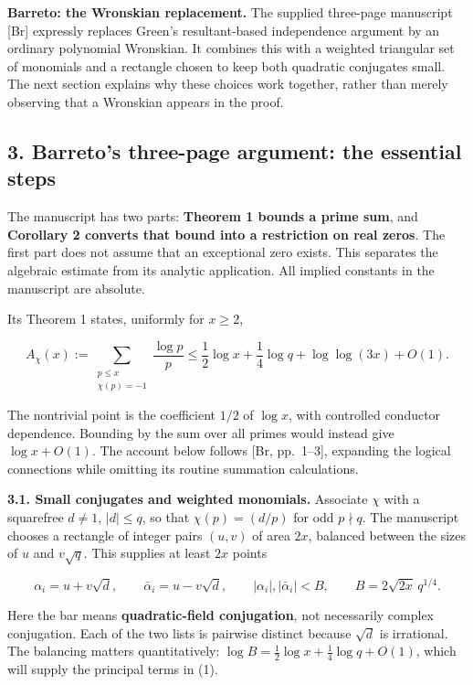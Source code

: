 \documentclass[11pt]{article}
\begin{document}
\textbf{Barreto: the Wronskian replacement.} The supplied three-page manuscript {[}Br{]} expressly replaces Green's resultant-based independence argument by an ordinary polynomial Wronskian. It combines this with a weighted triangular set of monomials and a rectangle chosen to keep both quadratic conjugates small. The next section explains why these choices work together, rather than merely observing that a Wronskian appears in the proof.

\subsection{3. Barreto's three-page argument: the essential steps}\label{barretos-three-page-argument-the-essential-steps}

The manuscript has two parts: \textbf{Theorem 1 bounds a prime sum}, and \textbf{Corollary 2 converts that bound into a restriction on real zeros}. The first part does not assume that an exceptional zero exists. This separates the algebraic estimate from its analytic application. All implied constants in the manuscript are absolute.

Its Theorem 1 states, uniformly for \(x\ge2\),

\[
A_\chi(x):=\sum_{\substack{p\le x\\\chi(p)=-1}}\frac{\log p}{p}
\le \frac12\log x+\frac14\log q+\log\log(3x)+O(1).
\tag{1}
\]

The nontrivial point is the coefficient \(1/2\) of \(\log x\), with controlled conductor dependence. Bounding by the sum over all primes would instead give \(\log x+O(1)\). The account below follows {[}Br, pp.~1--3{]}, expanding the logical connections while omitting its routine summation calculations.

\textbf{3.1. Small conjugates and weighted monomials.} Associate \(\chi\) with a squarefree \(d\ne1\), \(|d|\le q\), so that \(\chi(p)=(d/p)\) for odd \(p\nmid q\). The manuscript chooses a rectangle of integer pairs \((u,v)\) of area \(2x\), balanced between the sizes of \(u\) and \(v\sqrt q\). This supplies at least \(2x\) points

\[
\alpha_i=u+v\sqrt d,\qquad \bar\alpha_i=u-v\sqrt d,
\qquad |\alpha_i|,|\bar\alpha_i|<B,
\qquad B=2\sqrt{2x}\,q^{1/4}.
\]

Here the bar means \textbf{quadratic-field conjugation}, not necessarily complex conjugation. Each of the two lists is pairwise distinct because \(\sqrt d\) is irrational. The balancing matters quantitatively: \(\log B=\tfrac12\log x+\tfrac14\log q+O(1)\), which will supply the principal terms in (1).
\end{document}
